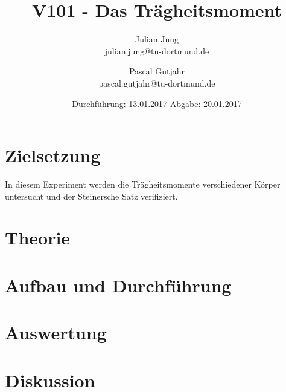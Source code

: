 

\title{V101 - Das Trägheitsmoment}
\author{Julian Jung \\ julian.jung@tu-dortmund.de
  \and Pascal Gutjahr \\ pascal.gutjahr@tu-dortmund.de}
  \date{Durchführung: 13.01.2017
  \hspace{3em}
  Abgabe: 20.01.2017}
  
\maketitle
\newpage
\tableofcontents
\newpage
\section{Zielsetzung}
In diesem Experiment werden die Trägheitsmomente verschiedener Körper untersucht
und der Steinersche Satz verifiziert.
\section{Theorie}

\section{Aufbau und Durchführung}

\section{Auswertung}

\section{Diskussion}

\printbibliography

